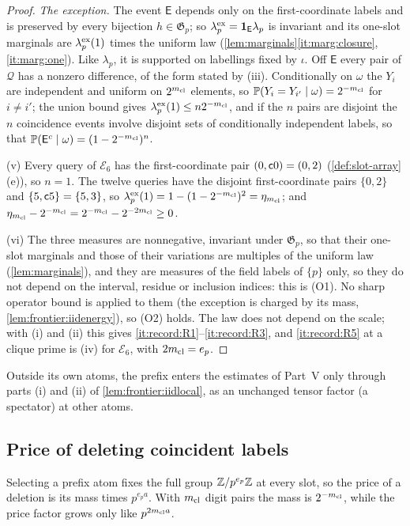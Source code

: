 \begin{proof}
\emph{The exception.} The event $\mathsf E$ depends only on the first-coordinate
labels and is preserved by every bijection $h\in\mathfrak G_p$; so
$\lambda^{\rm ex}_p=\mathbf 1_{\mathsf E}\lambda_p$ is invariant and its one-slot
marginals are $\lambda^{\rm ex}_p(1)$ times the uniform law
(\cref{lem:marginals}\ref{it:marg:closure}, \ref{it:marg:one}). Like
$\lambda_p$, it is supported on labellings fixed by $\iota$. Off $\mathsf E$
every pair of $\mathcal Q$ has a nonzero difference, of the form stated by
(iii). Conditionally on $\omega$ the $Y_i$ are independent and uniform on
$2^{m_{\mathrm{cl}}}$ elements, so $\mathbb P(Y_i=Y_{i'}\mid\omega)=2^{-m_{\mathrm{cl}}}$ for $i\ne i'$; the
union bound gives $\lambda^{\rm ex}_p(1)\le n2^{-m_{\mathrm{cl}}}$, and if the $n$ pairs
are disjoint the $n$ coincidence events involve disjoint sets of conditionally
independent labels, so that $\mathbb P(\mathsf E^c\mid\omega)=(1-2^{-m_{\mathrm{cl}}})^n$.

(v) Every query of $\mathcal E_6$ has the first-coordinate pair $(0,\mathsf c0)=(0,2)$
(\cref{def:slot-array}(e)), so $n=1$. The twelve queries have the disjoint
first-coordinate pairs $\{0,2\}$ and $\{5,\mathsf c5\}=\{5,3\}$, so
$\lambda^{\rm ex}_p(1)=1-(1-2^{-m_{\mathrm{cl}}})^2=\eta_{m_{\mathrm{cl}}}$; and
$\eta_{m_{\mathrm{cl}}}-2^{-m_{\mathrm{cl}}}=2^{-m_{\mathrm{cl}}}-2^{-2m_{\mathrm{cl}}}\ge0$.

(vi) The three measures are nonnegative, invariant under $\mathfrak G_p$, so that
their one-slot marginals and those of their variations are multiples of the
uniform law (\cref{lem:marginals}), and they are measures of the field labels
of $\{p\}$ only, so they do not depend on the interval, residue or inclusion
indices: this is (O1). No sharp operator bound is applied to them (the
exception is charged by its mass, \cref{lem:frontier:iidenergy}), so (O2) holds.
The law does not depend on the scale; with (i) and (ii) this gives
\ref{it:record:R1}--\ref{it:record:R3}, and \ref{it:record:R5} at a clique prime
is (iv) for $\mathcal E_6$, with $2m_{\mathrm{cl}}=e_p$.
\end{proof}

Outside its own atoms, the prefix enters the estimates of
Part~V only through parts (i) and (ii) of
\cref{lem:frontier:iidlocal}, as an unchanged tensor factor
(a spectator) at other atoms.

\subsection{Price of deleting coincident labels}\label{subsec:clique-price}

Selecting a prefix atom fixes the full group $\mathbb Z/p^{e_p}\mathbb Z$ at every slot, so
the price of a deletion is its mass times $p^{e_pa}$. With $m_{\mathrm{cl}}$ digit pairs
the mass is $2^{-m_{\mathrm{cl}}}$, while the price factor grows only like $p^{2m_{\mathrm{cl}} a}$.

